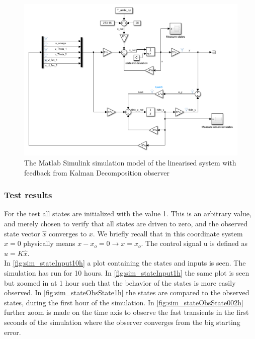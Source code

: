\begin{figure}[h!]
	\centering
	\includegraphics[width=1\textwidth]{Graphics/fig_modelSS_obs.png}
	\caption{The Matlab Simulink simulation model of the linearised system with feedback from Kalman Decomposition observer}
	\label{fig:sim_modelSS_obs}
\end{figure}

\subsubsection{Test results}

For the test all states are initialized with the value 1. This is an arbitrary value, and merely chosen to verify that all states are driven to zero, and the observed state vector $\hat{x}$ converges to $x$. We briefly recall that in this coordinate system $x=0$ physically means $x-x_o = 0 \rightarrow x=x_o$. The control signal u is defined as $u=K\hat{x}$.\\

In \cref{fig:sim_stateInput10h} a plot containing the states and inputs is seen. The simulation has run for 10 hours. In \cref{fig:sim_stateInput1h} the same plot is seen but zoomed in at 1 hour such that the behavior of the states is more easily observed. In \cref{fig:sim_stateObsState1h} the states are compared to the observed states, during the first hour of the simulation. In \cref{fig:sim_stateObsState002h} further zoom is made on the time axis to observe the fast transients in the first seconds of the simulation where the observer converges from the big starting error.


